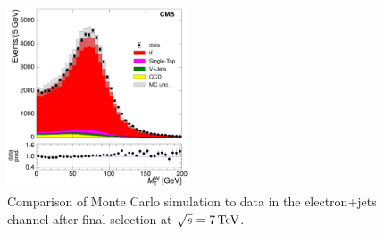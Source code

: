 \begin{figure}[hbtp]
     \includegraphics[width=0.48\textwidth]{Chapters/04_Analysis/04b_XSections/images/control_plots/before_fit/7TeV/EPlusJets_patType1CorrectedPFMet_MT_2orMoreBtags_with_ratio.pdf}\hfill
     \caption{Comparison of Monte Carlo simulation to data in the electron+jets channel after final
     selection at $\sqrt{s}=7\,\text{Te\hspace{-.08em}V}$.}
     \label{fig:data_mc_comparison_7TeV_electron}
\end{figure}

